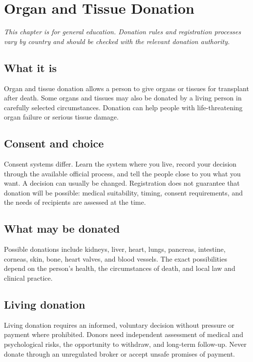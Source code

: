 \chapter{Organ and Tissue Donation}

\medskip
\noindent\textit{This chapter is for general education. Donation rules and registration processes vary by country and should be checked with the relevant donation authority.}

\section*{What it is}
Organ and tissue donation allows a person to give organs or tissues for transplant after death. Some organs and tissues may also be donated by a living person in carefully selected circumstances. Donation can help people with life-threatening organ failure or serious tissue damage.

\section*{Consent and choice}
Consent systems differ. Learn the system where you live, record your decision through the available official process, and tell the people close to you what you want. A decision can usually be changed. Registration does not guarantee that donation will be possible: medical suitability, timing, consent requirements, and the needs of recipients are assessed at the time.

\section*{What may be donated}
Possible donations include kidneys, liver, heart, lungs, pancreas, intestine, corneas, skin, bone, heart valves, and blood vessels. The exact possibilities depend on the person’s health, the circumstances of death, and local law and clinical practice.

\section*{Living donation}
Living donation requires an informed, voluntary decision without pressure or payment where prohibited. Donors need independent assessment of medical and psychological risks, the opportunity to withdraw, and long-term follow-up. Never donate through an unregulated broker or accept unsafe promises of payment.

